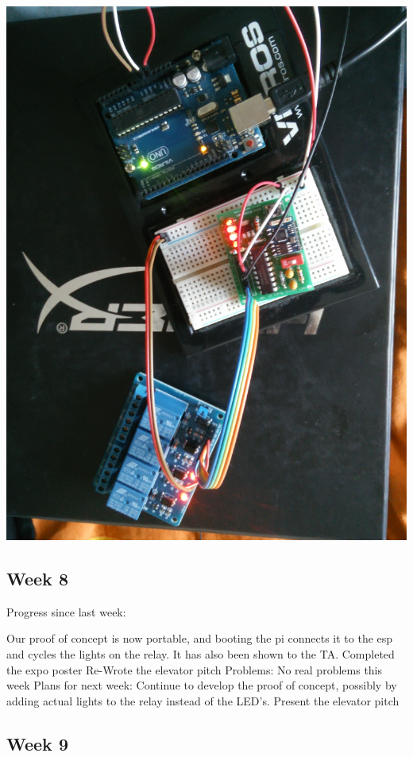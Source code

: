 \documentclass[letterpaper,10pt]{article}
\begin{document}
\includegraphics[scale=0.1]{circuit.jpg}

\subsection{Week 8}
 
Progress since last week: 
 
Our proof of concept is now portable, and booting the pi connects it to the esp and cycles the lights on the relay. It has also been shown to the TA. 
Completed the expo poster 
Re-Wrote the elevator pitch 
Problems: 
No real problems this week 
Plans for next week: 
Continue to develop the proof of concept, possibly by adding actual lights to the relay instead of the LED's. 
Present the elevator pitch 

\subsection{Week 9}
 
\end{document}
